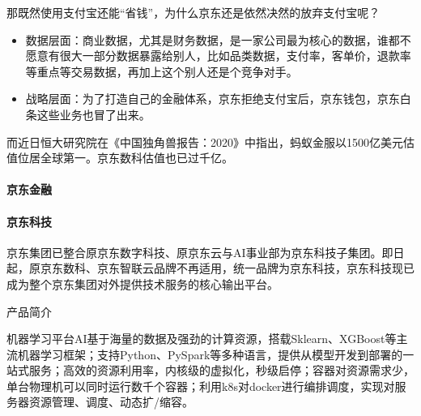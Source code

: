 \documentclass[letterpaper,11pt,english]{sphinxmanual}
\begin{document}
那既然使用支付宝还能“省钱”，为什么京东还是依然决然的放弃支付宝呢？
\begin{itemize}
\item {} 
数据层面：商业数据，尤其是财务数据，是一家公司最为核心的数据，谁都不愿意有很大一部分数据暴露给别人，比如品类数据，支付率，客单价，退款率等重点等交易数据，再加上这个别人还是个竞争对手。

\item {} 
战略层面：为了打造自己的金融体系，京东拒绝支付宝后，京东钱包，京东白条这些业务也冒了出来。%
\begin{footnote}[900]\sphinxAtStartFootnote
{}
%
\end{footnote}

\end{itemize}

而近日恒大研究院在《中国独角兽报告：2020》中指出，蚂蚁金服以1500亿美元估值位居全球第一。京东数科估值也已过千亿。%
\begin{footnote}[901]\sphinxAtStartFootnote
{}
%
\end{footnote}


\paragraph{京东金融}
\label{\detokenize{chapter_company/jd:id5}}


\paragraph{京东科技}
\label{\detokenize{chapter_company/jd:id6}}
京东集团已整合原京东数字科技、原京东云与AI事业部为京东科技子集团。即日起，原京东数科、京东智联云品牌不再适用，统一品牌为京东科技，京东科技现已成为整个京东集团对外提供技术服务的核心输出平台。

产品简介

机器学习平台AI基于海量的数据及强劲的计算资源，搭载Sklearn、XGBoost等主流机器学习框架；支持Python、PySpark等多种语言，提供从模型开发到部署的一站式服务；高效的资源利用率，内核级的虚拟化，秒级启停；容器对资源需求少，单台物理机可以同时运行数千个容器；利用k8s对docker进行编排调度，实现对服务器资源管理、调度、动态扩/缩容。
\end{document}
